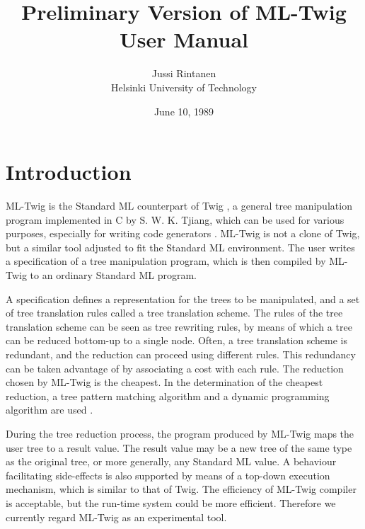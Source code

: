 \setlength{\textwidth}{15cm}
\setlength{\oddsidemargin}{4.6mm} %
\setlength{\evensidemargin}{\oddsidemargin}
\setlength{\textheight}{22cm}
\setlength{\topmargin}{-8mm}
\newcommand{\mltwig}{ML-Twig }

\title{Preliminary Version of \mltwig User Manual}
\author{Jussi Rintanen \\ Helsinki University of Technology}
\date{June 10, 1989}


\maketitle
\tableofcontents
\newpage
\section{Introduction}

\mltwig is the Standard ML counterpart of Twig
\cite{ahoganapathitjiang,tjiang}, a general tree manipulation program
implemented in C by S. W. K. Tjiang, which can be used for various purposes,
especially for writing code generators \cite{appel}.
\mltwig is not a clone of Twig, but a similar tool adjusted to fit
the Standard ML environment.
The user writes a specification of a tree manipulation program,
which is then compiled by \mltwig to an ordinary Standard ML program.

A specification defines a representation for the trees to be manipulated,
and a set of tree translation rules called a tree translation scheme.
The rules of the tree translation scheme can be seen as tree rewriting
rules, by means of which a tree can be reduced bottom-up to a single node.
Often, a tree translation scheme is redundant, and the reduction can
proceed using different rules. This redundancy can be taken
advantage of by associating a cost with each rule. The reduction chosen
by \mltwig is the cheapest. In the determination of the cheapest
reduction, a tree pattern matching algorithm and a dynamic programming
algorithm are used \cite{ahojohnson,hoffmannodonnell}.

During the tree reduction process, the program produced by \mltwig maps
the user tree to a result value. The result value may be a new tree of
the same type as the original tree, or more generally, any Standard ML value.
A behaviour facilitating side-effects is also supported by means of
a top-down execution mechanism, which is similar to that of Twig.
The efficiency of \mltwig compiler is acceptable, but the run-time system
could be more efficient. Therefore we currently regard \mltwig as
an experimental tool.

